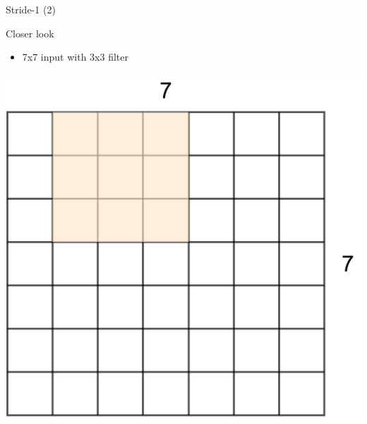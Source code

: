 \documentclass[default, aspectratio=169]{beamer}
\begin{document}
	\begin{frame}{Stride-1 (2)}
		\vspace{0.5cm}
		
		\normalsize Closer look
		\begin{itemize}
			\item 7x7 input with 3x3 filter
		\end{itemize}
		
		\centering
		\includegraphics[keepaspectratio, scale=0.25]{pic/Stride2.png}
	\end{frame}
\end{document}
